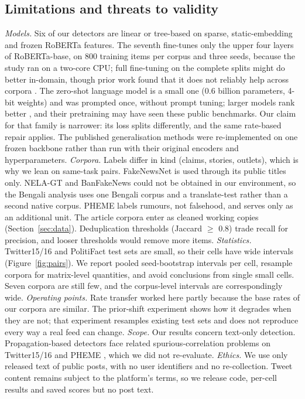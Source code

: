 \subsection{Limitations and threats to validity}\label{sec:limits}
\emph{Models.} Six of our detectors are linear or tree-based on sparse, static-embedding and frozen RoBERTa features. The seventh fine-tunes only the upper four layers of RoBERTa-base, on 800 training items per corpus and three seeds, because the study ran on a two-core CPU; full fine-tuning on the complete splits might do better in-domain, though prior work found that it does not reliably help across corpora \citep{verma2026audit,delloglio2026comparison}. The zero-shot language model is a small one (0.6 billion parameters, 4-bit weights) and was prompted once, without prompt tuning; larger models rank better \citep{pelrine2023gpt4,delloglio2026comparison,verhoeven2026yesterday}, and their pretraining may have seen these public benchmarks. Our claim for that family is narrower: its loss splits differently, and the same rate-based repair applies. The published generalisation methods were re-implemented on one frozen backbone rather than run with their original encoders and hyperparameters.
\emph{Corpora.} Labels differ in kind (claims, stories, outlets), which is why we lean on same-task pairs. FakeNewsNet is used through its public titles only. NELA-GT and BanFakeNews could not be obtained in our environment, so the Bengali analysis uses one Bengali corpus and a translate-test rather than a second native corpus. PHEME labels rumours, not falsehood, and serves only as an additional unit. The article corpora enter as cleaned working copies (Section~\ref{sec:data}). Deduplication thresholds (Jaccard $\geq$ 0.8) trade recall for precision, and looser thresholds would remove more items.
\emph{Statistics.} Twitter15/16 and PolitiFact test sets are small, so their cells have wide intervals (Figure~\ref{fig:pairs}). We report pooled seed-bootstrap intervals per cell, resample corpora for matrix-level quantities, and avoid conclusions from single small cells. Seven corpora are still few, and the corpus-level intervals are correspondingly wide.
\emph{Operating points.} Rate transfer worked here partly because the base rates of our corpora are similar. The prior-shift experiment shows how it degrades when they are not; that experiment resamples existing test sets and does not reproduce every way a real feed can change.
\emph{Scope.} Our results concern text-only detection. Propagation-based detectors face related spurious-correlation problems on Twitter15/16 and PHEME \citep{wu2022spurious,mu2023time,pelrine2021simple}, which we did not re-evaluate.
\emph{Ethics.} We use only released text of public posts, with no user identifiers and no re-collection. Tweet content remains subject to the platform's terms, so we release code, per-cell results and saved scores but no post text.
